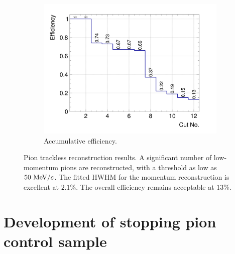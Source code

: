 \begin{figure}[ht]
\begin{subfigure}{\trfigwid\textwidth}
                   \label{fig:ppi-res}
              \end{subfigure}
              \begin{subfigure}{\trfigwid\textwidth}
                   \includegraphics[width=\textwidth]{figures/sel/INCL_p_pi_accum_eff_al11.png}
                   \caption{Accumulative efficiency.}
                   \label{fig:tl-accum-eff}
              \end{subfigure}
              \caption{Pion trackless reconstruction results. A significant number of low-momentum pions are reconstructed, with a threshold as low as $50~\textrm{MeV}/c$. The fitted HWHM for the momentum reconstruction is excellent at $2.1\%$. The overall efficiency remains acceptable at $13\%$.}
              \label{fig:piTLres}
           \end{figure}


    \section{Development of stopping pion control sample}


